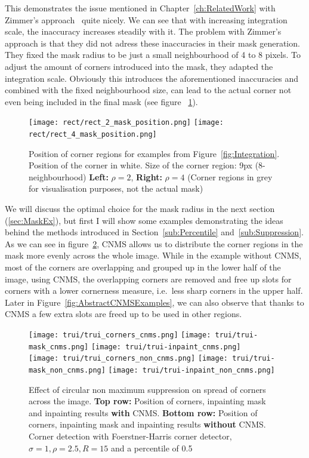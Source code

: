 \newpage\noindent
This demonstrates the issue mentioned in Chapter~\ref{ch:RelatedWork} with Zimmer's approach~\cite{zimmer07} quite nicely. 
We can see that with increasing integration scale, the inaccuracy increases
steadily with it. The problem with Zimmer's approach is that they did not adress these inaccuracies in
their mask generation. They fixed the mask radius to be just a small neighbourhood of 4 to 8 pixels.
To adjust the amount of corners introduced into the mask, they adapted the integration scale.
Obviously this introduces the aforementioned inaccuracies and combined with the fixed neighbourhood
size, can lead to the actual corner not even being included in the final mask (see figure
~\ref{fig:Inacc}).
\begin{figure}[h]
    \centering
    \texttt{[image: rect/rect\_2\_mask\_position.png]}
    \texttt{[image: rect/rect\_4\_mask\_position.png]}
    \caption{Position of corner regions for examples from Figure~\ref{fig:Integration}.
        Position of the corner in white. Size of the corner region: 9px (8-neighbourhood)
    \textbf{Left:} $\rho=2$, \textbf{Right:} $\rho=4$ (Corner regions in grey for visualisation
purposes, not the actual mask)}\label{fig:Inacc}
\end{figure}
We will discuss the optimal choice for the mask radius in the next section (\ref{sec:MaskEx}), but
first I will show some examples demonstrating the ideas behind the methods introduced in
Section~\ref{sub:Percentile} and~\ref{sub:Suppression}. As we can see in
figure~\ref{fig:CNMSExample}, CNMS allows us to distribute the corner regions in the mask more
evenly across the whole image. While in the example without CNMS, most of the corners are
overlapping and grouped up in the lower half of the image, using CNMS, the overlapping corners are
removed and free up slots for corners with a lower cornerness measure, i.e.\ less sharp corners in
the upper half. Later in Figure~\ref{fig:AbstractCNMSExamples}, we can also observe that thanks to
CNMS a few extra slots are freed up to be used in other regions.\\
\begin{figure}
    \centering
    \texttt{[image: trui/trui\_corners\_cnms.png]}
    \texttt{[image: trui/trui-mask\_cnms.png]}
    \texttt{[image: trui/trui-inpaint\_cnms.png]}\\
    \vspace{0.2cm}
    \texttt{[image: trui/trui\_corners\_non\_cnms.png]}
    \texttt{[image: trui/trui-mask\_non\_cnms.png]}
    \texttt{[image: trui/trui-inpaint\_non\_cnms.png]}
    \caption{Effect of circular non maximum suppression on spread of corners across the image.
        \textbf{Top row:} Position of corners, inpainting mask and inpainting results
        \textbf{with} CNMS\@.
\textbf{Bottom row:} Position of corners, inpainting mask and inpainting results \textbf{without}
CNMS\@.
    Corner detection with Foerstner-Harris corner detector, $\sigma=1,\rho=2.5,R=15$ and a
percentile of 0.5}\label{fig:CNMSExample}
\end{figure}
